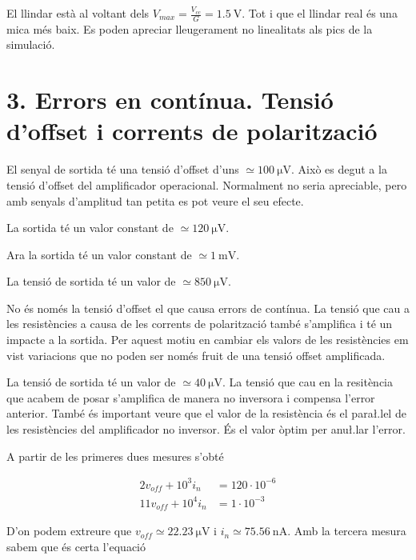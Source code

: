 \documentclass[catalan, a4paper, nobib]{tufte-handout}
\begin{document}
 El llindar està al voltant dels $V_{max}=\frac{V_{cc}}{G}=\qty{1.5}{\volt}$. Tot i que el llindar real és una mica més baix. Es poden apreciar lleugerament no linealitats als pics de la simulació.

\section{3. Errors en contínua. Tensió d'offset i corrents de polarització}
 El senyal de sortida té una tensió d'offset d'uns $\simeq\qty{100}{\micro\volt}$. Això es degut a la tensió d'offset del amplificador operacional. Normalment no seria apreciable, pero amb senyals d'amplitud tan petita es pot veure el seu efecte.

 La sortida té un valor constant de $\simeq\qty{120}{\micro\volt}$.

 Ara la sortida té un valor constant de $\simeq\qty{1}{\milli\volt}$.

 La tensió de sortida té un valor de $\simeq\qty{850}{\micro\volt}$.

 No és només la tensió d'offset el que causa errors de contínua. La tensió que cau a les resistències a causa de les corrents de polarització també s'amplifica i té un impacte a la sortida. Per aquest motiu en cambiar els valors de les resistències em vist variacions que no poden ser només fruit de una tensió offset amplificada.

 La tensió de sortida té un valor de $\simeq\qty{40}{\micro\volt}$. La tensió que cau en la resitència que acabem de posar s'amplifica de manera no inversora i compensa l'error anterior. També és important veure que el valor de la resistència és el para\l.lel de les resistències del amplificador no inversor. És el valor òptim per anu\l.lar l'error.

 A partir de les primeres dues mesures s'obté

\begin{align}
    2 v_{off} + 10^3 i_n &= 120 \cdot 10^{-6} \\
    11 v_{off} + 10^4 i_n &= 1 \cdot 10^{-3}
\end{align}

D'on podem extreure que $v_{off} \simeq \qty{22.23}{\micro\volt}$ i $i_n \simeq \qty{75.56}{\nano\ampere}$. Amb la tercera mesura sabem que és certa l'equació
\end{document}
